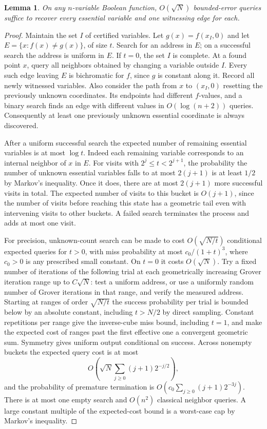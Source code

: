 \documentclass[11pt]{article}
\newtheorem{lemma}[theorem]{Lemma}
\begin{document}
\begin{lemma}\label{lem:essential}
On any $n$-variable Boolean function, $O(\sqrt N)$ bounded-error queries suffice to recover every essential variable and one witnessing edge for each.
\end{lemma}
\begin{proof}
Maintain the set $I$ of certified variables. Let $g(x)=f(x_I,0)$ and let $E=\{x:f(x)\ne g(x)\}$, of size $t$. Search for an address in $E$; on a successful search the address is uniform in $E$. If $t=0$, the set $I$ is complete. At a found point $x$, query all neighbors obtained by changing a variable outside $I$. Every such edge leaving $E$ is bichromatic for $f$, since $g$ is constant along it. Record all newly witnessed variables. Also consider the path from $x$ to $(x_I,0)$ resetting the previously unknown coordinates. Its endpoints had different $f$-values, and a binary search finds an edge with different values in $O(\log(n+2))$ queries. Consequently at least one previously unknown essential coordinate is always discovered.

After a uniform successful search the expected number of remaining essential variables is at most $\log t$. Indeed each remaining variable corresponds to an internal neighbor of $x$ in $E$. For visits with $2^j\le t<2^{j+1}$, the probability the number of unknown essential variables falls to at most $2(j+1)$ is at least $1/2$ by Markov's inequality. Once it does, there are at most $2(j+1)$ more successful visits in total. The expected number of visits to this bucket is $O(j+1)$, since the number of visits before reaching this state has a geometric tail even with intervening visits to other buckets. A failed search terminates the process and adds at most one visit.

For precision, unknown-count search \cite{bbht} can be made to cost $O(\sqrt{N/t})$ conditional expected queries for $t>0$, with miss probability at most $c_0/(1+t)^3$, where $c_0>0$ is any prescribed small constant. On $t=0$ it costs $O(\sqrt N)$. Try a fixed number of iterations of the following trial at each geometrically increasing Grover iteration range up to $C\sqrt N$: test a uniform address, or use a uniformly random number of Grover iterations in that range, and verify the measured address. Starting at ranges of order $\sqrt{N/t}$ the success probability per trial is bounded below by an absolute constant, including $t>N/2$ by direct sampling. Constant repetitions per range give the inverse-cube miss bound, including $t=1$, and make the expected cost of ranges past the first effective one a convergent geometric sum. Symmetry gives uniform output conditional on success. Across nonempty buckets the expected query cost is at most
\[
 O\!\left(\sqrt N\sum_{j\ge0}(j+1)2^{-j/2}\right),
\]
and the probability of premature termination is $O(c_0\sum_{j\ge0}(j+1)2^{-3j})$. There is at most one empty search and $O(n^2)$ classical neighbor queries. A large constant multiple of the expected-cost bound is a worst-case cap by Markov's inequality.
\end{proof}
\end{document}
